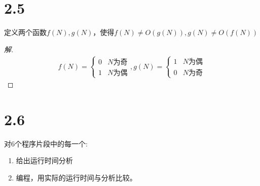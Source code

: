 \documentclass[utf8]{ctexart}
\begin{document}
\section*{2.5}
定义两个函数$f(N),g(N)$，使得$f(N) \ne O(g(N)),g(N) \ne O(f(N))$
\begin{proof}[解]
    \begin{gather*}
    f(N) = \begin{cases}
        0& N为奇\\ 1 &N为偶
    \end{cases},
    g(N) = \begin{cases}
        1 &N 为偶 \\ 0 & N 为奇
    \end{cases}
    \end{gather*}
\end{proof}

\section*{2.6}
对6个程序片段中的每一个:
\begin{enumerate}
    \item 给出运行时间分析
    \item 编程，用实际的运行时间与分析比较。
\end{enumerate}
\end{document}
